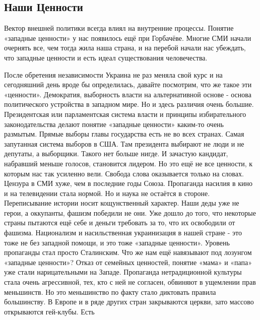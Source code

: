  
 

\subsection{Наши Ценности}
\label{sec:16_10_2020.fb.alex_belyy.1_cennosti}

Вектор внешней политики всегда влиял на внутренние процессы. Понятие «западные
ценности» у нас появилось ещё при Горбачёве. Многие СМИ начали очернять все,
чем тогда жила наша страна, и на перебой начали нас убеждать, что западные
ценности и есть идеал существования человечества.

После обретения независимости Украина  не раз меняла свой курс и на сегодняшний
день вроде бы определилась, давайте посмотрим, что же такое эти «ценности».
Демократия, выборность власти на альтернативной основе - основа политического
устройства в западном мире.  Но и здесь различия очень большие.  Президентская
или парламентская система власти и принципы избирательного законодательства
делают понятие «западные ценности» каким-то очень размытым.  Прямые выборы
главы государства есть не во всех странах.  Самая запутанная система выборов в
США.  Там президента выбирают не люди и не депутаты, а выборщики.  Такого нет
больше нигде.  И зачастую кандидат, набравший меньше голосов, становится
лидером.  Но это ещё не все ценности, к которым нас так усиленно вели.  Свобода
слова оказывается только на словах.  Цензура в СМИ хуже, чем в последние годы
Союза.  Пропаганда насилия в кино и на телевидении стала нормой.  Но и наука не
остаётся в стороне.  Переписывание истории носит кощунственный характер.  Наши
деды уже не герои, а оккупанты, фашизм победили не они.  Уже дошло до того, что
некоторые страны пытаются ещё себе и деньги требовать за то, что их освободили
от фашизма.  Национализм и насильственная украинизация в нашей стране - это
тоже не без западной помощи, и это тоже «западные ценности».  Уровень
пропаганды стал просто Сталинским.  Что же нам ещё навязывают под лозунгом
«западные ценности»?  Отказ от семейных ценностей, понятие «мама» и «папа» уже
стали нарицательными на Западе.  Пропаганда нетрадиционной культуры стала очень
агрессивной, тех, кто с ней не согласен, обвиняют в ущемлении прав меньшинств.
Но это меньшинство по факту стало диктовать правила большинству.  В Европе и в
ряде других стран закрываются церкви, зато массово открываются гей-клубы.  Есть
